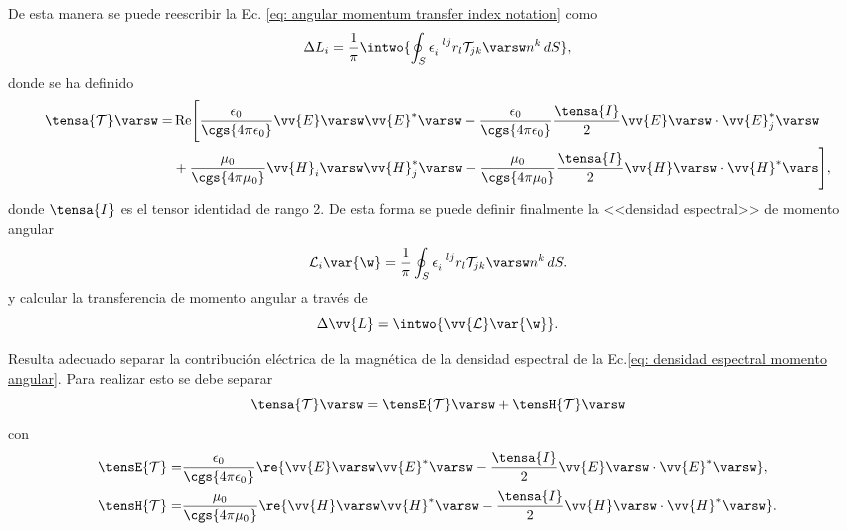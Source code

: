 De esta manera se puede reescribir la Ec. \eqref{eq: angular momentum transfer index notation} como
\begin{equation}
\Delta L_i = \frac{1}{\pi} \intwo{\oint_S \epsilon_{i}^{\,\,\,\, lj} r_l \mathcal{T}_{jk}\varsw n^k\,dS},
\label{eq: angular momentum transfer index notation freq domain}
\end{equation}
donde se ha definido 
\begin{align}
\tensa{\mathcal{T}}\varsw =& \,{\rm Re}\Bigg[\frac{\epsilon_0}{\cgs{4\pi\epsilon_0}} \vv{E} \varsw \vv{E}^{*}\varsw-\frac{\epsilon_0}{\cgs{4\pi\epsilon_0}} \frac{\tensa{I}}{2} \vv{E} \varsw\cdot\vv{E}_j^{*}\varsw \nonumber \\
& + \frac{\mu_0}{\cgs{4\pi\mu_0}} \vv{H}_i \varsw \vv{H}_j^{*}\varsw- \frac{\mu_0}{\cgs{4\pi\mu_0}} \frac{\tensa{I}}{2}  \vv{H} \varsw\cdot\vv{H}^{*}\vars \Bigg],
\end{align}
donde $\tensa{I}$ es el tensor identidad de rango 2. De esta forma se puede definir finalmente la <<densidad espectral>> de momento angular 
\begin{equation}
\mathcal{L}_i\var{\w} = \frac{1}{\pi} \oint_S \epsilon_{i}^{\,\,\,\, lj} r_l \mathcal{T}_{jk}\varsw n^k\,dS.
\end{equation}
y calcular la transferencia de momento angular a través de 
\begin{equation}
\Delta \vv{L} = \intwo{\vv{\mathcal{L}}\var{\w}}.
\label{eq: densidad espectral momento angular}
\end{equation}

Resulta adecuado separar la contribución eléctrica de la magnética de la densidad espectral de la Ec.\eqref{eq: densidad espectral momento angular}. Para realizar esto se debe separar
\begin{equation}
\tensa{\mathcal{T}}\varsw = \tensE{\mathcal{T}}\varsw +\tensH{\mathcal{T}}\varsw 
\end{equation}
con 
\begin{align}
\tensE{\mathcal{T}}=& \frac{\epsilon_0}{\cgs{4\pi\epsilon_0}} \re{\vv{E}\varsw \vv{E}^{*}\varsw - \frac{\tensa{I}}{2} \vv{E}\varsw\cdot\vv{E}^{*}\varsw},\\
\tensH{\mathcal{T}}=& \frac{\mu_0}{\cgs{4\pi\mu_0}} \re{\vv{H}\varsw \vv{H}^{*}\varsw - \frac{\tensa{I}}{2} \vv{H}\varsw\cdot\vv{H}^{*}\varsw}.
\end{align}

